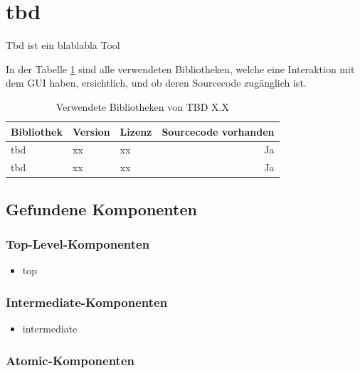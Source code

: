   \section{tbd}
  
  Tbd ist ein blablabla Tool
  
  In der Tabelle \ref{tab:bibliothekenTbd} sind alle verwendeten
  Bibliotheken, welche eine Interaktion mit dem \ac{GUI} haben, ersichtlich,
  und ob deren Sourcecode zugänglich ist.
  
  \begin{table}[ht]
    \sffamily 
    \begin{center}
      \begin{tabular}{lllr}
        \toprule
        Bibliothek & Version & Lizenz & Sourcecode vorhanden \\
        \midrule
        tbd & xx & xx & Ja\\
        tbd & xx & xx & Ja\\
        \bottomrule
      \end{tabular}
      \caption{Verwendete Bibliotheken von TBD X.X}
      \label{tab:bibliothekenTbd}
    \end{center}
  \end{table}
  
  \subsection{Gefundene Komponenten}
  
  \subsubsection{Top-Level-Komponenten}
  
  \begin{itemize}
    \item top
  \end{itemize}
  
  \subsubsection{Intermediate-Komponenten}
  
  \begin{itemize}
    \item intermediate
  \end{itemize}
  
  \subsubsection{Atomic-Komponenten}
  
